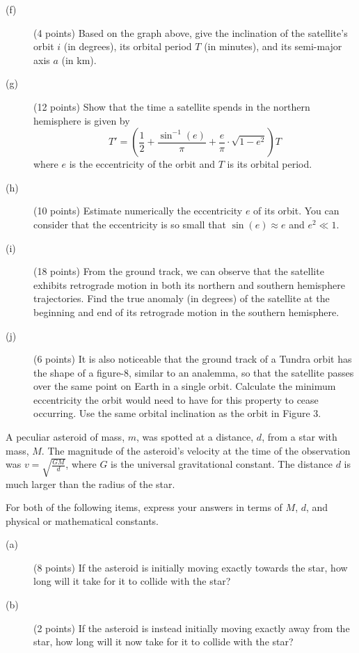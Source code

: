 
\begin{description}
\item[(f)] (4 points) Based on the graph above, give the inclination of the
  satellite's orbit $i$ (in degrees), its orbital period $T$ (in minutes), and
  its semi-major axis $a$ (in km).
\item[(g)] (12 points) Show that the time a satellite spends in the northern
  hemisphere is given by
  \[ T' = \left( \frac{1}{2} + \frac{\sin^{-1}(e)}{\pi}
     + \frac{e}{\pi}\cdot\sqrt{1 - e^2} \right) T \]
  where $e$ is the eccentricity of the orbit and $T$ is its orbital period.
\item[(h)] (10 points) Estimate numerically the eccentricity $e$ of its orbit.
  You can consider that the eccentricity is so small that
  $\sin(e) \approx e$ and $e^2 \ll 1$.
\item[(i)] (18 points) From the ground track, we can observe that the
  satellite exhibits retrograde motion in both its northern and southern
  hemisphere trajectories. Find the true anomaly (in degrees) of the satellite
  at the beginning and end of its retrograde motion in the southern
  hemisphere.
\item[(j)] (6 points) It is also noticeable that the ground track of a Tundra
  orbit has the shape of a figure-8, similar to an analemma, so that the
  satellite passes over the same point on Earth in a single orbit. Calculate
  the minimum eccentricity the orbit would need to have for this property to
  cease occurring. Use the same orbital inclination as the orbit in Figure 3.
\end{description}

A peculiar asteroid of mass, $m$, was spotted at a distance, $d$, from a star
with mass, $M$. The magnitude of the asteroid's velocity at the time of the
observation was $v = \sqrt{\frac{GM}{d}}$, where $G$ is the universal
gravitational constant. The distance $d$ is much larger than the radius of the
star.

For both of the following items, express your answers in terms of $M$, $d$,
and physical or mathematical constants.

\begin{description}
\item[(a)] (8 points) If the asteroid is initially moving exactly towards the
  star, how long will it take for it to collide with the star?
\item[(b)] (2 points) If the asteroid is instead initially moving exactly away
  from the star, how long will it now take for it to collide with the star?
\end{description}

